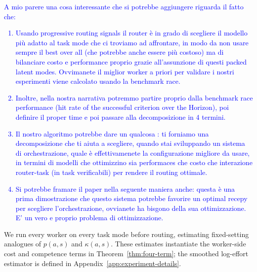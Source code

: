 \documentclass{article}
\begin{document}
\textcolor{blue}{A mio parere una cosa interessante che si potrebbe aggiungere riguarda il fatto che: 
\begin{enumerate}
    \item Usando progressive routing signals il router è in grado di scegliere il modello più adatto al task mode che ci troviamo ad affrontare, in modo da non usare sempre il best over all (che potrebbe anche essere più costoso) ma di bilanciare costo e performance proprio grazie all'assunzione di questi packed latent modes. Ovvimanete il miglior worker a priori per validare i nostri esperimenti viene calcolato usando la benchmark race. 
    \item Inoltre, nella nostra narrativa potremmo partire proprio dalla benchmark race performance (hit rate of the successful criterion over the Horizon), poi definire il proper time e poi passare alla decomposizione in 4 termini. 
    \item Il nostro algoritmo potrebbe dare un qualcosa : ti forniamo una decomposizione che ti aiuta a scegliere, quando stai sviluppando un sistema di orchestrazione, quale è effettivamenete la configurazione migliore da usare, in termini di modelli che ottimizzino sia performaces che costo che interazione router-task (in task verificabili) per rendere il routing ottimale. 
    \item Si potrebbe framare il paper nella seguente maniera anche: questa è una prima dimostrazione che questo sistema potrebbe favorire un optimal recepy per scegliere l'orchestrazione, ovvianete ha bisgono della sua ottimizzazione. E' un vero e proprio problema di ottimizzazione. 
\end{enumerate}
}
We run every worker on every task mode before routing, estimating fixed-setting analogues of \(p(a,s)\) and \(\kappa(a,s)\).
These estimates instantiate the worker-side cost and competence terms in Theorem~\ref{thm:four-term}; the smoothed log-effort estimator is defined in Appendix~\ref{app:experiment-details}.
\end{document}
